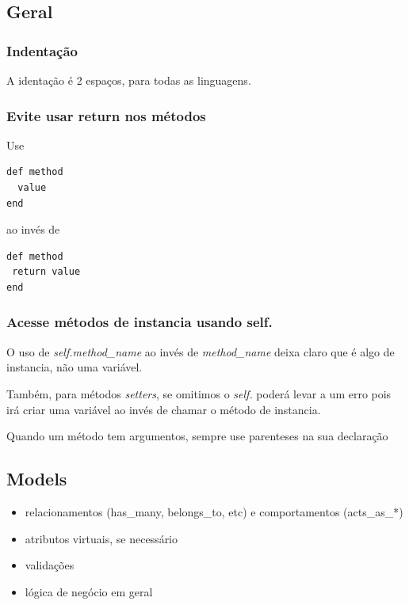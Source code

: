 \documentclass[11pt]{article}
\begin{document}

\subsection{Geral}

\subsubsection{Indentação}

A identação é 2 espaços, para todas as linguagens.

\subsubsection{Evite usar return nos métodos}

Use

\begin{Verbatim}[frame=single,fontfamily=courier]
def method
  value
end
\end{Verbatim}

ao invés de

\begin{Verbatim}[frame=single,fontfamily=courier]
def method
 return value
end
\end{Verbatim}

\subsubsection{Acesse métodos de instancia usando self.}

O uso de {\it self.method\_name} ao invés de {\it method\_name} deixa claro que
é algo de instancia, não uma variável.

Também, para métodos {\it setters}, se omitimos o {\it self.} poderá levar a
um erro pois irá criar uma variável ao invés de chamar o método de instancia.

Quando um método tem argumentos, sempre use parenteses na sua declaração

\subsection{Models}

\begin{itemize}
  \item relacionamentos (has\_many, belongs\_to, etc) e comportamentos
    (acts\_as\_*)
  \item atributos virtuais, se necessário
  \item validações
  \item lógica de negócio em geral
\end{itemize}
\end{document}
